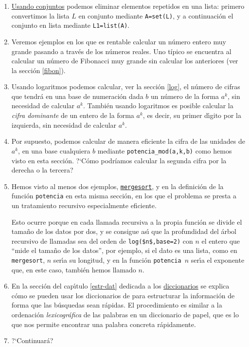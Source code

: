 \begin{enumerate}
 \item \hyperlink{conj}{Usando conjuntos} podemos eliminar elementos repetidos
en una lista:
primero convertimos la lista $L$  en conjunto mediante 
 \lstinline|A=set(L)|, y a continuaci\'on el conjunto en lista mediante
\lstinline|L1=list(A)|. 

\item Veremos ejemplos en los que es rentable calcular un n\'umero entero muy
grande pasando a trav\'es de los n\'umeros reales. Uno t\'ipico se encuentra al
calcular un n\'umero de Fibonacci muy grande sin calcular los anteriores (ver la
secci\'on \ref{fibon}).
 
 \item Usando logaritmos podemos calcular, ver la secci\'on \ref{log},  el
n\'umero de cifras que tendr\'a
en una base de numeraci\'on dada $b$ un n\'umero de la forma $a^k$,  sin
necesidad de calcular $a^k$. Tambi\'en usando logaritmos es posible calcular
la {\itshape cifra dominante} de un entero de la forma $a^k$, es decir, su
primer d\'{\i}gito por la izquierda, sin necesidad de calcular $a^k$. 

\item Por supuesto,  podemos calcular de manera eficiente la cifra de las
unidades de $a^k$, en una base cualquiera $b$  mediante 
\lstinline|potencia_mod(a,k,b)| como hemos visto en esta secci\'on. ?`C\'omo
podr\'iamos calcular la segunda cifra por la derecha o la tercera?

\item Hemos visto al menos dos ejemplos, \hyperref[mergesort]{\tt mergesort}, y
en la definici\'on de la funci\'on \lstinline|potencia|
en esta misma secci\'on, en los que
el problema se presta a un tratamiento recursivo especialmente eficiente. 

Esto ocurre porque  en cada llamada recursiva a la propia funci\'on  se divide
el tama\~no de los datos por dos, y se consigue as\'{\i} que la profundidad del
\'arbol recursivo de llamadas sea del orden de \lstinline|log($n$,base=2)| con
$n$
el entero que ``mide el tama\~no de los datos'', por ejemplo,  si el dato es una
lista, como en \lstinline|mergesort|,  $n$ ser\'{\i}a su longitud, y en
la funci\'on \lstinline|potencia|~$n$ ser\'{\i}a el exponente que, en este caso,
tambi\'en
hemos llamado $n$.

\item En la secci\'on del cap\'{\i}tulo \ref{estr-dat} dedicada a los 
\hyperref[diccionarios]{diccionarios} se explica c\'omo se pueden usar los
diccionarios de {\sage} para estructurar la informaci\'on de forma que las
b\'usquedas sean r\'apidas. El procedimiento es similar a la ordenaci\'on
{\itshape lexicogr\'afica} de las palabras en un diccionario de papel, que es
lo que nos permite encontrar una palabra concreta r\'apidamente.  

\item {\sc  ?`Continuar\'a?}
\end{enumerate}


